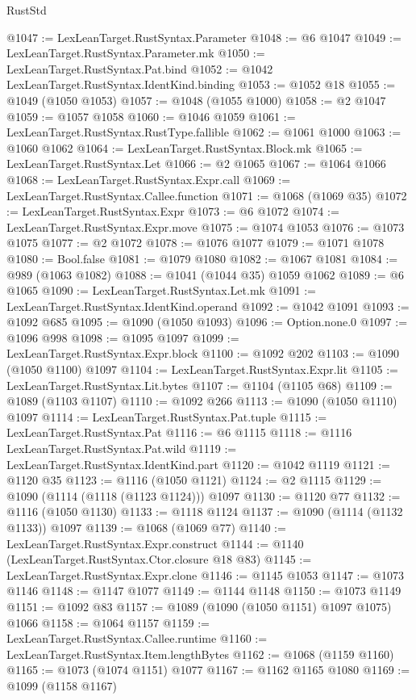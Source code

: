 \begin{lexlean}{RustStd}
\begin{coremodule}
@1047 := LexLeanTarget.RustSyntax.Parameter
@1048 := @6 @1047
@1049 := LexLeanTarget.RustSyntax.Parameter.mk
@1050 := LexLeanTarget.RustSyntax.Pat.bind
@1052 := @1042 LexLeanTarget.RustSyntax.IdentKind.binding
@1053 := @1052 @18
@1055 := @1049 (@1050 @1053)
@1057 := @1048 (@1055 @1000)
@1058 := @2 @1047
@1059 := @1057 @1058
@1060 := @1046 @1059
@1061 := LexLeanTarget.RustSyntax.RustType.fallible
@1062 := @1061 @1000
@1063 := @1060 @1062
@1064 := LexLeanTarget.RustSyntax.Block.mk
@1065 := LexLeanTarget.RustSyntax.Let
@1066 := @2 @1065
@1067 := @1064 @1066
@1068 := LexLeanTarget.RustSyntax.Expr.call
@1069 := LexLeanTarget.RustSyntax.Callee.function
@1071 := @1068 (@1069 @35)
@1072 := LexLeanTarget.RustSyntax.Expr
@1073 := @6 @1072
@1074 := LexLeanTarget.RustSyntax.Expr.move
@1075 := @1074 @1053
@1076 := @1073 @1075
@1077 := @2 @1072
@1078 := @1076 @1077
@1079 := @1071 @1078
@1080 := Bool.false
@1081 := @1079 @1080
@1082 := @1067 @1081
@1084 := @989 (@1063 @1082)
@1088 := @1041 (@1044 @35) @1059 @1062
@1089 := @6 @1065
@1090 := LexLeanTarget.RustSyntax.Let.mk
@1091 := LexLeanTarget.RustSyntax.IdentKind.operand
@1092 := @1042 @1091
@1093 := @1092 @685
@1095 := @1090 (@1050 @1093)
@1096 := Option.none.{0}
@1097 := @1096 @998
@1098 := @1095 @1097
@1099 := LexLeanTarget.RustSyntax.Expr.block
@1100 := @1092 @202
@1103 := @1090 (@1050 @1100) @1097
@1104 := LexLeanTarget.RustSyntax.Expr.lit
@1105 := LexLeanTarget.RustSyntax.Lit.bytes
@1107 := @1104 (@1105 @68)
@1109 := @1089 (@1103 @1107)
@1110 := @1092 @266
@1113 := @1090 (@1050 @1110) @1097
@1114 := LexLeanTarget.RustSyntax.Pat.tuple
@1115 := LexLeanTarget.RustSyntax.Pat
@1116 := @6 @1115
@1118 := @1116 LexLeanTarget.RustSyntax.Pat.wild
@1119 := LexLeanTarget.RustSyntax.IdentKind.part
@1120 := @1042 @1119
@1121 := @1120 @35
@1123 := @1116 (@1050 @1121)
@1124 := @2 @1115
@1129 := @1090 (@1114 (@1118 (@1123 @1124))) @1097
@1130 := @1120 @77
@1132 := @1116 (@1050 @1130)
@1133 := @1118 @1124
@1137 := @1090 (@1114 (@1132 @1133)) @1097
@1139 := @1068 (@1069 @77)
@1140 := LexLeanTarget.RustSyntax.Expr.construct
@1144 := @1140 (LexLeanTarget.RustSyntax.Ctor.closure @18 @83)
@1145 := LexLeanTarget.RustSyntax.Expr.clone
@1146 := @1145 @1053
@1147 := @1073 @1146
@1148 := @1147 @1077
@1149 := @1144 @1148
@1150 := @1073 @1149
@1151 := @1092 @83
@1157 := @1089 (@1090 (@1050 @1151) @1097 @1075) @1066
@1158 := @1064 @1157
@1159 := LexLeanTarget.RustSyntax.Callee.runtime
@1160 := LexLeanTarget.RustSyntax.Item.lengthBytes
@1162 := @1068 (@1159 @1160)
@1165 := @1073 (@1074 @1151) @1077
@1167 := @1162 @1165 @1080
@1169 := @1099 (@1158 @1167)

\end{coremodule}
\end{lexlean}
